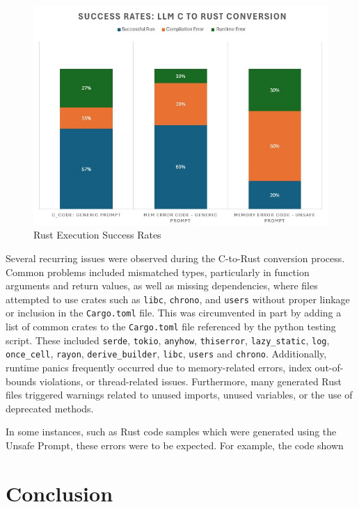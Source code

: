\documentclass[conference]{IEEEtran}
\begin{document}
\begin{figure}
    \centering
    \includegraphics[width=1.0\linewidth]{Success Rates.jpg}
    \caption{Rust Execution Success Rates}
    \label{fig:enter-label}
\end{figure}

Several recurring issues were observed during the C-to-Rust conversion process. Common problems included mismatched types, particularly in function arguments and return values, as well as missing dependencies, where files attempted to use crates such as \texttt{libc}, \texttt{chrono}, and \texttt{users} without proper linkage or inclusion in the \texttt{Cargo.toml} file. This was circumvented in part by adding a list of common crates to the \texttt{Cargo.toml} file referenced by the python testing script. These included \texttt{serde}, \texttt{tokio}, \texttt{anyhow}, \texttt{thiserror}, \texttt{lazy\_static}, \texttt{log}, \texttt{once\_cell}, \texttt{rayon}, \texttt{derive\_builder}, \texttt{libc}, \texttt{users} and \texttt{chrono}. Additionally, runtime panics frequently occurred due to memory-related errors, index out-of-bounds violations, or thread-related issues. Furthermore, many generated Rust files triggered warnings related to unused imports, unused variables, or the use of deprecated methods.

In some instances, such as Rust code samples which were generated using the Unsafe Prompt, these errors were to be expected. For
example, the code shown


\section{Conclusion}



\end{document}
